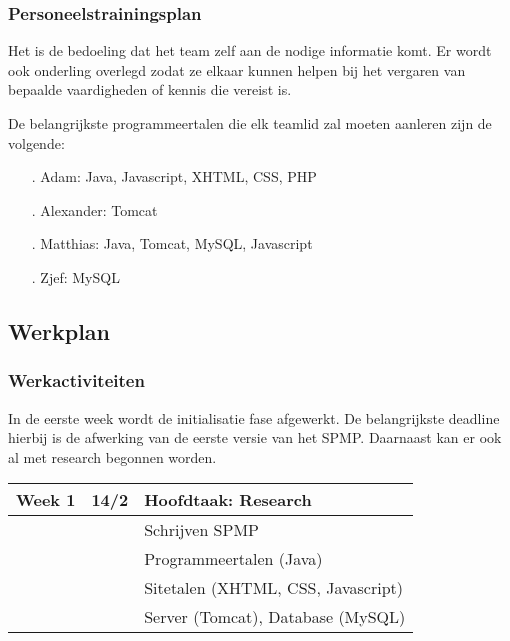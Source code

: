 \documentclass{article}
\begin{document}
\subsubsection{Personeelstrainingsplan}

Het is de bedoeling dat het team zelf aan de nodige informatie komt. Er wordt ook onderling overlegd zodat ze elkaar kunnen helpen bij het vergaren van bepaalde vaardigheden of kennis die vereist is.

De belangrijkste programmeertalen die elk teamlid zal moeten aanleren zijn de volgende:

\begin{itemize}
\item[.] Adam: Java, Javascript, XHTML, CSS, PHP
\item[.] Alexander: Tomcat
\item[.] Matthias: Java, Tomcat, MySQL, Javascript
\item[.] Zjef: MySQL
\end{itemize}

\subsection{Werkplan}

\subsubsection{Werkactiviteiten}

In de eerste week wordt de initialisatie fase afgewerkt. De belangrijkste deadline hierbij is de afwerking van de eerste versie van het SPMP. Daarnaast kan er ook al met research begonnen worden.
\begin{center}
\begin{tabular}[t]{|p{1.3cm}|p{0.8cm}|p{9cm}|}
\hline
Week 1	& 14/2 &	\textbf{Hoofdtaak:} Research \\
\hline
 & & Schrijven SPMP \\
 & & Programmeertalen (Java) \\
 & & Sitetalen (XHTML, CSS, Javascript) \\ 
 & & Server (Tomcat), Database (MySQL) \\
 \hline
\end{tabular}
\end{center}
\end{document}

